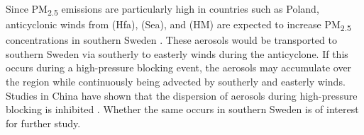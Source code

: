 Since PM\textsubscript{2.5} emissions are particularly high in countries such as Poland, anticyclonic winds from (Hfa), (Sea), and (HM) are expected to increase PM\textsubscript{2.5} concentrations in southern Sweden \cite{EEA2024}. These aerosols would be transported to southern Sweden via southerly to easterly winds during the anticyclone. If this occurs during a high-pressure blocking event, the aerosols may accumulate over the region while continuously being advected by southerly and easterly winds. Studies in China have shown that the dispersion of aerosols during high-pressure blocking is inhibited \cite{Cai2020}. Whether the same occurs in southern Sweden is of interest for further study.
